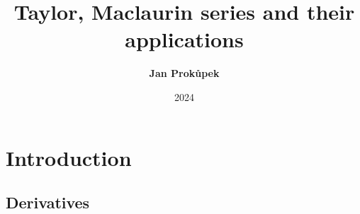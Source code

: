 \documentclass[12pt]{report}
\title{\huge \textbf{Taylor, Maclaurin series and their applications}}
\author{\Large \textbf{Jan Prokůpek}}
\date{\Large 2024}
\begin{document}
\maketitle
\pagebreak
\tableofcontents
\pagebreak
\chapter{Introduction}
\section{Derivatives}
\end{document}
